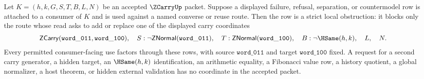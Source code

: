 \begin{corollary}
\label{cor:zeckendorfcarry-strict-local-obstruction}
Let $K=(h,k,G,S,T,B,L,N)$ be an accepted $\ZCarryUp$ packet. Suppose a displayed failure, refusal, separation, or countermodel row is attached to a consumer of $K$ and is used against a named converse or reuse route. Then the row is a strict local obstruction: it blocks only the route whose read asks to add or replace one of the displayed carry coordinates
$$
\mathsf{ZCarry}(\mathtt{word\_011},\mathtt{word\_100}),\quad
S:\neg\mathsf{ZNormal}(\mathtt{word\_011}),\quad
T:\mathsf{ZNormal}(\mathtt{word\_100}),\quad
B:\neg\HSame(h,k),\quad
L,\quad N.
$$
Every permitted consumer-facing use factors through these rows, with source $\mathtt{word\_011}$ and target $\mathtt{word\_100}$ fixed. A request for a second carry generator, a hidden target, an $\HSame(h,k)$ identification, an arithmetic equality, a Fibonacci value row, a history quotient, a global normalizer, a host theorem, or hidden external validation has no coordinate in the accepted packet.
\end{corollary}
